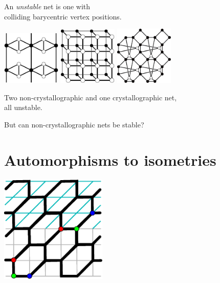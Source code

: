 \documentclass{beamer}
\begin{document}
\begin{frame}
  \begin{center}
    An {\em unstable} net is one with\\
    colliding barycentric vertex positions.

    \includegraphics[width=1.1in]{unstable}
    \quad
    \includegraphics[width=1.1in]{ladder}
    \quad
    \includegraphics[width=1.1in]{collision}

    Two non-crystallographic and one crystallographic net,\\
    all unstable.

    But can non-crystallographic nets be stable?
  \end{center}
\end{frame}


\section{Automorphisms to isometries}

\begin{frame}
  \begin{center}
    \includegraphics[width=2in]{affine}
  \end{center}
\end{frame}
\end{document}
